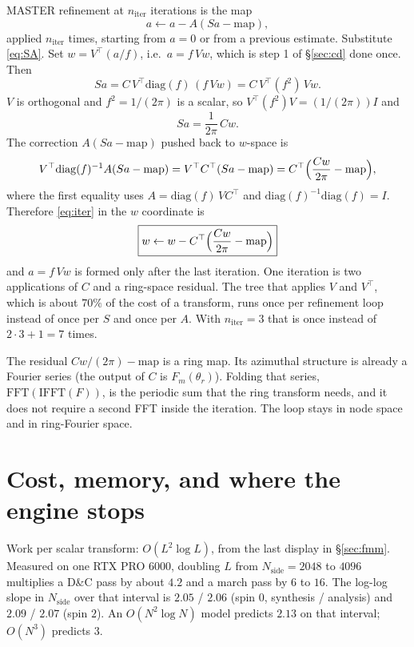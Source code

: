 \documentclass[11pt,a4paper]{article}
\numberwithin{equation}{section}
\begin{document}
MASTER refinement at $n_{\mathrm{iter}}$ iterations is the map
\begin{equation}
  a \leftarrow a - A(Sa - \mathrm{map}),
  \label{eq:iter}
\end{equation}
applied $n_{\mathrm{iter}}$ times, starting from $a=0$ or from a previous estimate.
Substitute \eqref{eq:SA}. Set $w=V^\top(a/f)$, i.e.\ $a=f\,Vw$, which is step 1 of
\S\ref{sec:cd} done once. Then
\[
  Sa = C\, V^\top \mathrm{diag}(f)\, (f\, V w) = C\, V^\top (f^2)\, V w.
\]
$V$ is orthogonal and $f^2=1/(2\pi)$ is a scalar, so $V^\top (f^2) V=(1/(2\pi))I$ and
\[
  Sa = \frac{1}{2\pi}\, C w.
\]
The correction $A(Sa-\mathrm{map})$ pushed back to $w$-space is
\[
  V^\top \mathrm{diag}(f)^{-1} A(Sa-\mathrm{map})
  = V^\top C^\top (Sa-\mathrm{map})
  = C^\top\Bigl(\frac{Cw}{2\pi}-\mathrm{map}\Bigr),
\]
where the first equality uses $A=\mathrm{diag}(f)\, V C^\top$ and $\mathrm{diag}(f)^{-1}\mathrm{diag}(f)=I$.
Therefore \eqref{eq:iter} in the $w$ coordinate is
\begin{equation}
  \boxed{ w \leftarrow w - C^\top\Bigl(\frac{Cw}{2\pi} - \mathrm{map}\Bigr) }
  \label{eq:witer}
\end{equation}
and $a=f\,Vw$ is formed only after the last iteration.
One iteration is two applications of $C$ and a ring-space residual. The tree that applies
$V$ and $V^\top$, which is about $70\%$ of the cost of a transform, runs once per refinement
loop instead of once per $S$ and once per $A$. With $n_{\mathrm{iter}}=3$ that is once
instead of $2\cdot 3+1=7$ times.

The residual $Cw/(2\pi)-\mathrm{map}$ is a ring map. Its azimuthal structure is already a
Fourier series (the output of $C$ is $F_m(\theta_r)$). Folding that series,
$\mathrm{FFT}(\mathrm{IFFT}(F))$, is the periodic sum that the ring transform needs, and it
does not require a second FFT inside the iteration. The loop stays in node space and in
ring-Fourier space.

\section{Cost, memory, and where the engine stops}
\label{sec:cost}

Work per scalar transform: $O(L^2\log L)$, from the last display in \S\ref{sec:fmm}.
Measured on one RTX PRO 6000, doubling $L$ from $N_{\mathrm{side}}=2048$ to $4096$
multiplies a D\&C pass by about $4.2$ and a march pass by $6$ to $16$. The log-log slope
in $N_{\mathrm{side}}$ over that interval is $2.05$ / $2.06$ (spin $0$, synthesis /
analysis) and $2.09$ / $2.07$ (spin $2$). An $O(N^2\log N)$ model predicts $2.13$ on that
interval; $O(N^3)$ predicts $3$.
\end{document}

